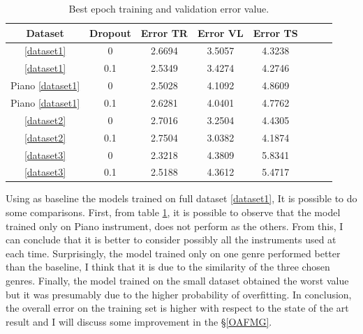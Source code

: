 \begin{center}
	\small\addtolength{\tabcolsep}{-3pt}
	\begin{table}[h!]
		\centering
		\begin{tabular}{|c|c|c|c|c|c|c|c|}
			\hline
			\textbf{Dataset}& \textbf{Dropout} & \textbf{Error TR} & \textbf{Error VL} & \textbf{Error TS}\\ \hline
			\ref{dataset1} &  0 & 2.6694 & 3.5057 & 4.3238 \\
			\ref{dataset1} &  0.1 & 2.5349 & 3.4274 & 4.2746 \\		 
			Piano \ref{dataset1} & 0 & 2.5028 & 4.1092 & 4.8609 \\			
			Piano \ref{dataset1} & 0.1 & 2.6281 & 4.0401 & 4.7762 \\	
			\ref{dataset2} & 0 & 2.7016 & 3.2504 & 4.4305 \\	
			\ref{dataset2} & 0.1 & 2.7504 & 3.0382 & 4.1874 \\
			\ref{dataset3} & 0 & 2.3218 & 4.3809 & 5.8341 \\
			\ref{dataset3} & 0.1 & 2.5188 & 4.3612 & 5.4717\\
			\hline
		\end{tabular}
		\caption{Best epoch training and validation error value.}
		\label{tab:test_value}
	\end{table}
\end{center}




Using as baseline the models trained on full dataset \ref{dataset1}, It is possible to do some comparisons. First, from table \ref{tab:test_value}, it is possible to observe that the model trained only on Piano instrument, does not perform as the others. From this, I can conclude that it is better to consider possibly all the instruments used at each time. Surprisingly, the model trained only on one genre performed better than the baseline, I think that it is due to the similarity of the three chosen genres. Finally, the model trained on the small dataset obtained the worst value but it was presumably due to the higher probability of overfitting. In conclusion, the overall error on the training set is higher with respect to the state of the art result and I will discuss some improvement in the \S \ref{OAFMG}.

